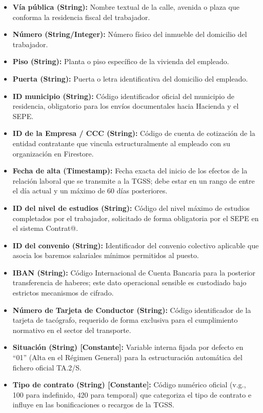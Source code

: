 \begin{itemize}
    \item \textbf{Vía pública (String):} Nombre textual de la calle, avenida o plaza que conforma la residencia fiscal del trabajador.
    \item \textbf{Número (String/Integer):} Número físico del inmueble del domicilio del trabajador.
    \item \textbf{Piso (String):} Planta o piso específico de la vivienda del empleado.
    \item \textbf{Puerta (String):} Puerta o letra identificativa del domicilio del empleado.
    \item \textbf{ID municipio (String):} Código identificador oficial del municipio de residencia, obligatorio para los envíos documentales hacia Hacienda y el SEPE.
    \item \textbf{ID de la Empresa / CCC (String):} Código de cuenta de cotización de la entidad contratante que vincula estructuralmente al empleado con su organización en Firestore.
    \item \textbf{Fecha de alta (Timestamp):} Fecha exacta del inicio de los efectos de la relación laboral que se transmite a la TGSS; debe estar en un rango de entre el día actual y un máximo de 60 días posteriores.
    \item \textbf{ID del nivel de estudios (String):} Código del nivel máximo de estudios completados por el trabajador, solicitado de forma obligatoria por el SEPE en el sistema Contrat@.
    \item \textbf{ID del convenio (String):} Identificador del convenio colectivo aplicable que asocia los baremos salariales mínimos permitidos al puesto.
    \item \textbf{IBAN (String):} Código Internacional de Cuenta Bancaria para la posterior transferencia de haberes; este dato operacional sensible es custodiado bajo estrictos mecanismos de cifrado.
    \item \textbf{Número de Tarjeta de Conductor (String):} Código identificador de la tarjeta de tacógrafo, requerido de forma exclusiva para el cumplimiento normativo en el sector del transporte.
    \item \textbf{Situación (String) [Constante]:} Variable interna fijada por defecto en ``01'' (Alta en el Régimen General) para la estructuración automática del fichero oficial TA.2/S.
    \item \textbf{Tipo de contrato (String) [Constante]:} Código numérico oficial (v.g., 100 para indefinido, 420 para temporal) que categoriza el tipo de contrato e influye en las bonificaciones o recargos de la TGSS.

\end{itemize}
